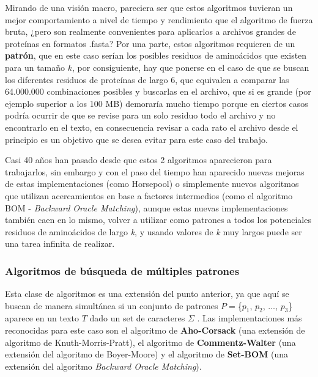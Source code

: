 Mirando de una visión macro, pareciera ser que estos algoritmos tuvieran un mejor comportamiento a nivel de tiempo y rendimiento que el algoritmo de fuerza bruta, ¿pero son realmente convenientes para aplicarlos a archivos grandes de proteínas en formatos .fasta? Por una parte, estos algoritmos requieren de un \textbf{patrón}, que en este caso serían los posibles residuos de aminoácidos que existen para un tamaño $k$, por consiguiente, hay que ponerse en el caso de que se buscan los diferentes residuos de proteínas de largo 6, que equivalen a comparar las 64.000.000 combinaciones posibles y buscarlas en el archivo, que si es grande (por ejemplo superior a los 100 MB) demoraría mucho tiempo porque en ciertos casos podría ocurrir de que se revise para un solo residuo todo el archivo y no encontrarlo en el texto, en consecuencia revisar a cada rato el archivo desde el principio es un objetivo que se desea evitar para este caso del trabajo.

Casi 40 años han pasado desde que estos 2 algoritmos aparecieron para trabajarlos, sin embargo y con el paso del tiempo han aparecido nuevas mejoras de estas implementaciones (como Horsepool) o simplemente nuevos algoritmos que utilizan acercamientos en base a factores intermedios (como el algoritmo BOM - \textit{Backward Oracle Matching}), aunque estas nuevas implementaciones también caen en lo mismo, volver a utilizar como patrones a todos los potenciales residuos de aminoácidos de largo \textit{k}, y usando valores de \textit{k} muy largos puede ser una tarea infinita de realizar.

\subsubsection{Algoritmos de búsqueda de múltiples patrones}

Esta clase de algoritmos es una extensión del punto anterior, ya que aquí se buscan de manera simultánea si un conjunto de patrones $P=$\{$p_{1}$, $p_{2}$, $\ldots$, $p_{3}$\} aparece en un texto $T$ dado un set de caracteres $\Sigma$ \cite{stringmatching}. Las implementaciones más reconocidas para este caso son el algoritmo de \textbf{Aho-Corsack} (una extensión de algoritmo de Knuth-Morris-Pratt), el algoritmo de \textbf{Commentz-Walter} (una extensión del algoritmo de Boyer-Moore) y el algoritmo de \textbf{Set-BOM} (una extensión del algoritmo \textit{Backward Oracle Matching}). 

